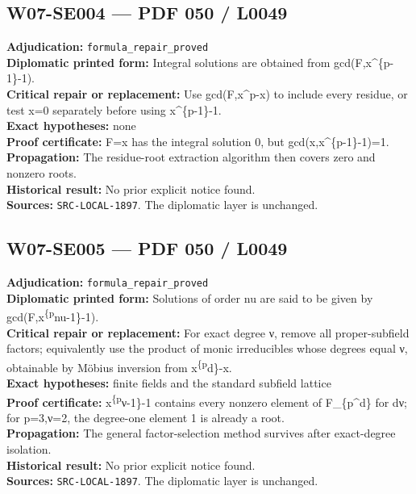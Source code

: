 \documentclass[
  10pt,
  a4paper,
]{scrreprt}
\begin{document}
\subsection{W07-SE004 --- PDF 050 /
L0049}\label{w07-se004-pdf-050-l0049}

\textbf{Adjudication:} \texttt{formula\_repair\_proved}\\
\textbf{Diplomatic printed form:} Integral solutions are obtained from
gcd(F,x\^{}\{p-1\}-1).\\
\textbf{Critical repair or replacement:} Use gcd(F,x\^{}p-x) to include
every residue, or test x=0 separately before using x\^{}\{p-1\}-1.\\
\textbf{Exact hypotheses:} none\\
\textbf{Proof certificate:} F=x has the integral solution 0, but
gcd(x,x\^{}\{p-1\}-1)=1.\\
\textbf{Propagation:} The residue-root extraction algorithm then covers
zero and nonzero roots.\\
\textbf{Historical result:} No prior explicit notice found.\\
\textbf{Sources:} \texttt{SRC-LOCAL-1897}. The diplomatic layer is
unchanged.

\subsection{W07-SE005 --- PDF 050 /
L0049}\label{w07-se005-pdf-050-l0049}

\textbf{Adjudication:} \texttt{formula\_repair\_proved}\\
\textbf{Diplomatic printed form:} Solutions of order nu are said to be
given by gcd(F,x\textsuperscript{\{p}nu-1\}-1).\\
\textbf{Critical repair or replacement:} For exact degree ν, remove all
proper-subfield factors; equivalently use the product of monic
irreducibles whose degrees equal ν, obtainable by Möbius inversion from
x\textsuperscript{\{p}d\}-x.\\
\textbf{Exact hypotheses:} finite fields and the standard subfield
lattice\\
\textbf{Proof certificate:} x\textsuperscript{\{p}ν-1\}-1 contains every
nonzero element of F\_\{p\^{}d\} for d\textbar ν; for p=3,ν=2, the
degree-one element 1 is already a root.\\
\textbf{Propagation:} The general factor-selection method survives after
exact-degree isolation.\\
\textbf{Historical result:} No prior explicit notice found.\\
\textbf{Sources:} \texttt{SRC-LOCAL-1897}. The diplomatic layer is
unchanged.
\end{document}
